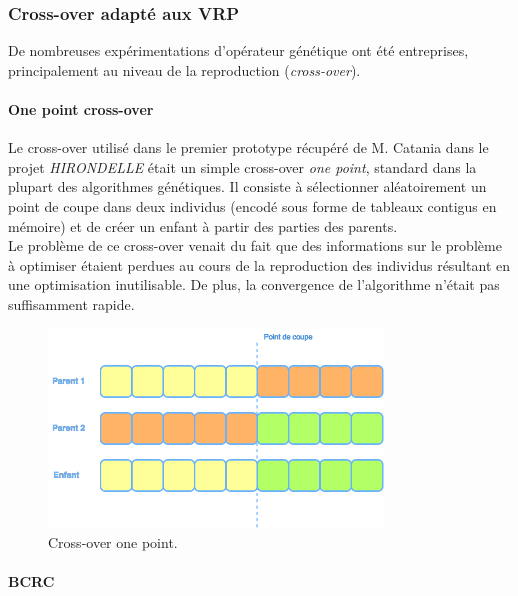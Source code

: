 \documentclass[french, 11pt]{memoir}
\begin{document}
\subsubsection{Cross-over adapté aux
VRP}\label{cross-over-adaptuxe9-aux-vrp}

De nombreuses expérimentations d'opérateur génétique ont été
entreprises, principalement au niveau de la reproduction
(\emph{cross-over}).

\paragraph{One point cross-over}\label{one-point-cross-over}

Le cross-over utilisé dans le premier prototype récupéré de M. Catania
dans le projet \textit{HIRONDELLE} était un simple cross-over \emph{one point},
standard dans la plupart des algorithmes génétiques. Il consiste à
sélectionner aléatoirement un point de coupe dans deux individus (encodé
sous forme de tableaux contigus en mémoire) et de créer un enfant à
partir des parties des parents.\\ 
Le problème de ce cross-over venait du
fait que des informations sur le problème à optimiser étaient perdues au
cours de la reproduction des individus résultant en une optimisation
inutilisable. De plus, la convergence de l'algorithme n'était pas
suffisamment rapide.


\begin{figure}[htbp]
	\begin{center}
		\includegraphics[width=3.5in]{img/crossover.png}
		\caption{Cross-over one point.}
	\end{center}
\end{figure}


\paragraph{BCRC}\label{bcrc}
\end{document}
